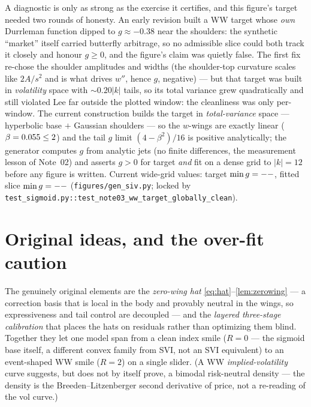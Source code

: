\documentclass[11pt]{article}
\begin{document}
\begin{remark}
\label{rem:targetbug}
A diagnostic is only as strong as the exercise it certifies, and this
figure's target needed two rounds of honesty. An early revision built a WW
target whose \emph{own} Durrleman function dipped to $g\approx-0.38$ near the
shoulders: the synthetic ``market'' itself carried butterfly arbitrage, so no
admissible slice could both track it closely and honour $g\ge0$, and the
figure's claim was quietly false. The first fix re-chose the shoulder
amplitudes and widths (the shoulder-top curvature scales like $2A/s^2$ and is
what drives $w''$, hence $g$, negative) --- but that target was built in
\emph{volatility} space with $\sim0.20|k|$ tails, so its total variance grew
quadratically and still violated Lee far outside the plotted window: the
cleanliness was only per-window. The current construction builds the target
in \emph{total-variance} space --- hyperbolic base $+$ Gaussian shoulders ---
so the $w$-wings are exactly linear ($\beta=0.055\le2$) and the tail
$g$ limit $(4-\beta^2)/16$ is positive analytically; the generator computes
$g$ from analytic jets (no finite differences, the measurement lesson of
Note~02) and asserts $g>0$ for target \emph{and} fit on a dense grid to
$|k|=12$ before any figure is written. Current wide-grid values: target
$\min g=--$, fitted slice $\min g=--$
(\nolinkurl{figures/gen_siv.py}; locked by
\nolinkurl{test_sigmoid.py::test_note03_ww_target_globally_clean}).
\end{remark}

\section{Original ideas, and the over-fit caution}
\label{sec:original}

The genuinely original elements are the \emph{zero-wing hat}
\eqref{eq:hat}--\cref{lem:zerowing} --- a correction basis that is local in the
body and provably neutral in the wings, so expressiveness and tail control are
decoupled --- and the \emph{layered three-stage calibration} that places the hats
on residuals rather than optimizing them blind. Together they let one model span
from a clean index smile ($R=0$ --- the sigmoid base itself, a different
convex family from SVI, not an SVI equivalent) to an event-shaped WW smile
($R=2$) on a single slider. (A WW \emph{implied-volatility} curve suggests,
but does not by itself prove, a bimodal risk-neutral density --- the density
is the Breeden--Litzenberger second derivative of price, not a re-reading of
the vol curve.)
\end{document}
